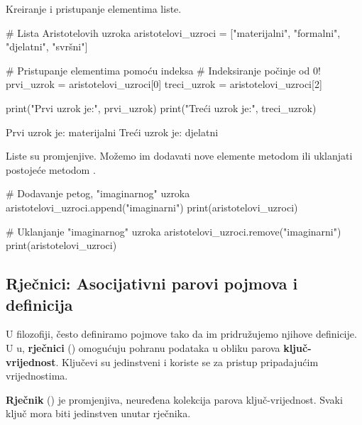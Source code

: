 \begin{primjerokvir}
    Kreiranje i pristupanje elementima liste.
    \begin{pythoncode}
# Lista Aristotelovih uzroka
aristotelovi_uzroci = ["materijalni", "formalni", "djelatni", "svršni"]

# Pristupanje elementima pomoću indeksa
# Indeksiranje počinje od 0!
prvi_uzrok = aristotelovi_uzroci[0]
treci_uzrok = aristotelovi_uzroci[2]

print("Prvi uzrok je:", prvi_uzrok)
print("Treći uzrok je:", treci_uzrok)
    \end{pythoncode}
    \begin{codeoutput}
Prvi uzrok je: materijalni
Treći uzrok je: djelatni
    \end{codeoutput}

    Liste su promjenjive. Možemo im dodavati nove elemente metodom  ili uklanjati postojeće metodom .

    \begin{pythoncode}
# Dodavanje petog, "imaginarnog" uzroka
aristotelovi_uzroci.append("imaginarni")
print(aristotelovi_uzroci)

# Uklanjanje "imaginarnog" uzroka
aristotelovi_uzroci.remove("imaginarni")
print(aristotelovi_uzroci)
    \end{pythoncode}
    \begin{codeoutput}
    \end{codeoutput}
\end{primjerokvir}

\subsection{Rječnici: Asocijativni parovi pojmova i definicija}

U filozofiji, često definiramo pojmove tako da im pridružujemo njihove definicije. U u, \textbf{rječnici} () omogućuju pohranu podataka u obliku parova \textbf{ključ-vrijednost}. Ključevi su jedinstveni i koriste se za pristup pripadajućim vrijednostima.

\begin{definicijaokvir}
    \textbf{Rječnik} () je promjenjiva, neuređena kolekcija parova ključ-vrijednost. Svaki ključ mora biti jedinstven unutar rječnika.
\end{definicijaokvir}

